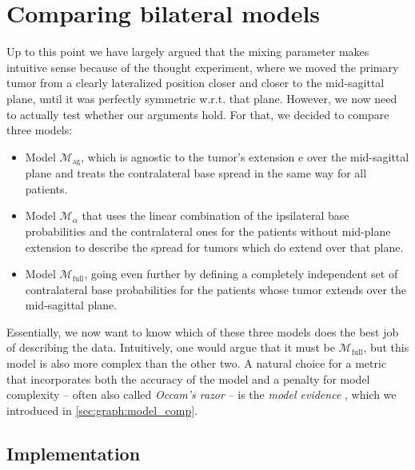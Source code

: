 \documentclass[\relativeRoot/main.tex]{subfiles}
\begin{document}
\section{Comparing bilateral models}
\label{sec:bilateral:model_comp}

Up to this point we have largely argued that the mixing parameter makes intuitive sense because of the thought experiment, where we moved the primary tumor from a clearly lateralized position closer and closer to the mid-sagittal plane, until it was perfectly symmetric w.r.t. that plane. However, we now need to actually test whether our arguments hold. For that, we decided to compare three models:

\begin{itemize}
    \item Model $\mathcal{M}_\text{ag}$, which is agnostic to the tumor's extension $\text{e}$ over the mid-sagittal plane and treats the contralateral base spread in the same way for all patients.
    \item Model $\mathcal{M}_\alpha$ that uses the linear combination of the ipsilateral base probabilities and the contralateral ones for the patients without mid-plane extension to describe the spread for tumors which do extend over that plane.
    \item Model $\mathcal{M}_\text{full}$, going even further by defining a completely independent set of contralateral base probabilities for the patients whose tumor extends over the mid-sagittal plane.
\end{itemize}

Essentially, we now want to know which of these three models does the best job of describing the data. Intuitively, one would argue that it must be $\mathcal{M}_\text{full}$, but this model is also more complex than the other two. A natural choice for a metric that incorporates both the accuracy of the model and a penalty for model complexity -- often also called \emph{Occam's razor} -- is the \emph{model evidence} \cite{aponte_introduction_2022}, which we introduced in \cref{sec:graph:model_comp}.

\subsection{Implementation}
\label{subsec:bilateral:model_comp:implementation}




\end{document}
